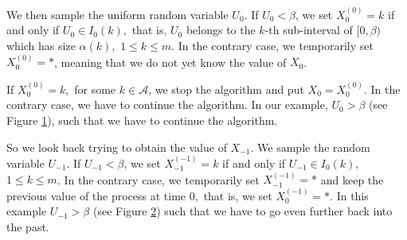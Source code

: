 \documentclass[a4paper]{article}
\newcommand{\A}{\mathcal{A}}
\begin{document}
We then sample the uniform random variable $U_0$. If $U_0<\beta$, we set $X^{(0)}_0=k$ if and only if $U_0 \in I_0 (k) ,$ that is, $ U_0$ belongs to the $k$-th sub-interval of $[0,\beta)$ which has size $\alpha(k),$ $ 1 \le k \le m.$ In the contrary case, we temporarily set $X^{(0)}_0=*$, meaning that we do not yet know the value of $X_0$. 

\begin{figure}[H]
\centering
{}
\caption{}
\label{fig:2}
\end{figure}

If $X^{(0)}_0=k, $ for some $k\in \A$, we stop the algorithm and put $ X_0 = X^{(0)}_0. $ In the contrary case, we have to continue the algorithm. In our example, $U_0>\beta$ (see Figure \ref{fig:2}), such that we have to continue the algorithm.


So we look back trying to obtain the value of $X_{-1}$. We sample the random variable $U_{-1}$. If $U_{-1}<\beta$, we set $X^{(-1)}_{-1}=k$ if and only if $U_{-1} \in I_0 (k) ,$ %
$ 1 \le k \le m$. In the contrary case, we temporarily set $X^{(-1)}_{-1}=*$ and keep the previous value of the process at time $0,$ that is, we set $ X^{(-1)}_0 = *.$ In this example $U_{-1}>\beta$
(see Figure \ref{fig:3}) such that we have to go even further back into the past. 

\begin{figure}[H]
\centering
{}
\caption{}
\label{fig:3}
\end{figure}
\end{document}
